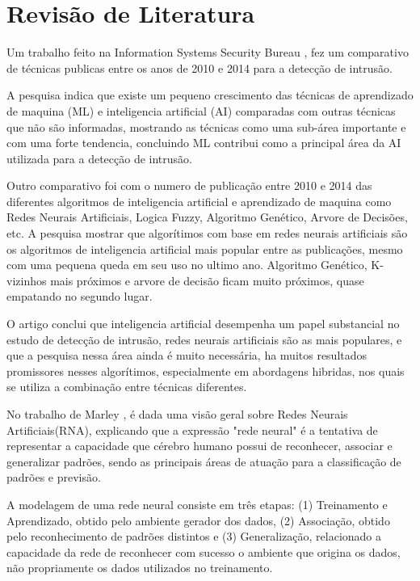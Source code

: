 \chapter[Revisão de Literatura]{Revisão de Literatura}

Um trabalho feito na Information Systems Security Bureau \cite{Stampar}, fez um comparativo de técnicas publicas entre os anos de 2010 e 2014 para a detecção de intrusão.

A pesquisa indica que existe um pequeno crescimento das técnicas de aprendizado de maquina (ML) e inteligencia artificial (AI) comparadas com outras técnicas que não são informadas, mostrando as técnicas como uma sub-área importante e com uma forte tendencia, concluindo ML contribui como a principal área da AI utilizada para a detecção de intrusão.

Outro comparativo foi com o numero de publicação entre 2010 e 2014 das diferentes algoritmos de inteligencia artificial e aprendizado de maquina como Redes Neurais Artificiais, Logica Fuzzy, Algoritmo Genético, Arvore de Decisões, etc. A pesquisa mostrar que algorítimos com base em redes neurais artificiais são os algoritmos de inteligencia artificial mais popular entre as publicações, mesmo com uma pequena queda em seu uso no ultimo ano. Algoritmo Genético, K-vizinhos mais próximos e arvore de decisão ficam muito próximos, quase empatando no segundo lugar.

O artigo conclui que inteligencia artificial desempenha um papel substancial no estudo de detecção de intrusão, redes neurais artificiais  são as mais populares, e que a pesquisa nessa área ainda é muito necessária, ha muitos resultados promissores nesses algorítimos,  especialmente em abordagens hibridas, nos quais se utiliza a combinação entre técnicas diferentes.


No trabalho de Marley  \cite{Marley}, é dada uma visão geral sobre Redes Neurais Artificiais(RNA), explicando que a expressão "rede neural" é a tentativa de representar a capacidade que cérebro humano possui de reconhecer, associar e generalizar padrões, sendo as principais áreas de atuação para a classificação de padrões e previsão.

A modelagem de uma rede neural consiste em três etapas: (1) Treinamento e Aprendizado, obtido pelo ambiente gerador dos dados, (2) Associação, obtido pelo reconhecimento de padrões distintos e (3) Generalização, relacionado a capacidade da rede de reconhecer com sucesso o ambiente que origina os dados, não propriamente os dados utilizados no treinamento.

